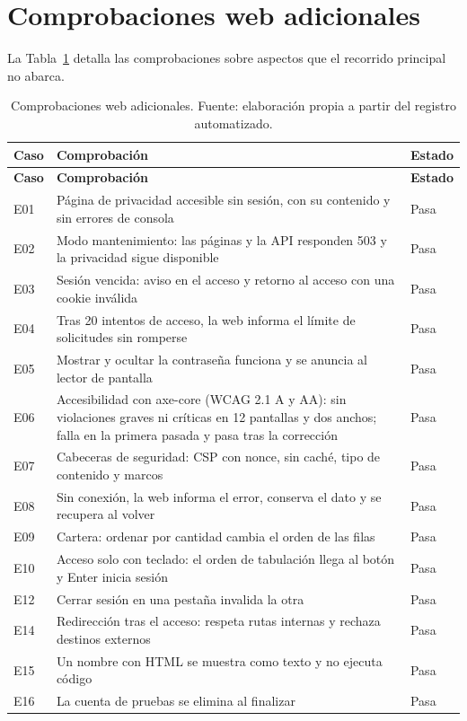 \section*{Comprobaciones web adicionales}
La Tabla~\ref{tab:casos-web-extra} detalla las comprobaciones sobre aspectos que el recorrido principal no abarca.
\begin{longtable}{>{\raggedright\arraybackslash}p{}>{\raggedright\arraybackslash}p{}p{}}
\caption{Comprobaciones web adicionales. Fuente: elaboración propia a partir del registro automatizado.}\label{tab:casos-web-extra}\\
\hline
\textbf{Caso} & \textbf{Comprobación} & \textbf{Estado}\\\hline\endfirsthead
\hline
\textbf{Caso} & \textbf{Comprobación} & \textbf{Estado}\\\hline\endhead
E01 & Página de privacidad accesible sin sesión, con su contenido y sin errores de consola & Pasa \\\hline
E02 & Modo mantenimiento: las páginas y la API responden 503 y la privacidad sigue disponible & Pasa \\\hline
E03 & Sesión vencida: aviso en el acceso y retorno al acceso con una cookie inválida & Pasa \\\hline
E04 & Tras 20 intentos de acceso, la web informa el límite de solicitudes sin romperse & Pasa \\\hline
E05 & Mostrar y ocultar la contraseña funciona y se anuncia al lector de pantalla & Pasa \\\hline
E06 & Accesibilidad con axe-core (WCAG 2.1 A y AA): sin violaciones graves ni críticas en 12 pantallas y dos anchos; falla en la primera pasada y pasa tras la corrección & Pasa \\\hline
E07 & Cabeceras de seguridad: CSP con nonce, sin caché, tipo de contenido y marcos & Pasa \\\hline
E08 & Sin conexión, la web informa el error, conserva el dato y se recupera al volver & Pasa \\\hline
E09 & Cartera: ordenar por cantidad cambia el orden de las filas & Pasa \\\hline
E10 & Acceso solo con teclado: el orden de tabulación llega al botón y Enter inicia sesión & Pasa \\\hline
E12 & Cerrar sesión en una pestaña invalida la otra & Pasa \\\hline
E14 & Redirección tras el acceso: respeta rutas internas y rechaza destinos externos & Pasa \\\hline
E15 & Un nombre con HTML se muestra como texto y no ejecuta código & Pasa \\\hline
E16 & La cuenta de pruebas se elimina al finalizar & Pasa \\\hline
\end{longtable}

